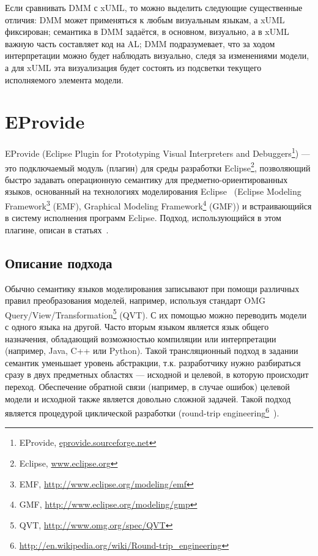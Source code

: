\documentclass[a5paper]{article}
\begin{document}
Если сравнивать DMM с xUML, то можно выделить следующие существенные отличия: DMM может применяться к любым визуальным языкам, а xUML фиксирован; семантика в DMM задаётся, в основном, визуально, а в xUML важную часть составляет код на AL; DMM подразумевает, что за ходом интерпретации можно будет наблюдать визуально, следя за изменениями модели, а для xUML эта визуализация будет состоять из подсветки текущего исполняемого элемента модели. 

\section{EProvide}

EProvide (Eclipse Plugin for Prototyping Visual Interpreters and Debuggers\footnote{EProvide, \url{eprovide.sourceforge.net}}) — это подключаемый модуль (плагин) для среды разработки Eclipse\footnote{Eclipse, \url{www.eclipse.org}}, позволяющий быстро задавать операционную семантику для предметно-ориентированных языков, основанный на технологиях моделирования Eclipse~\cite{koznov7} (Eclipse Modeling Framework\footnote{EMF, \url{http://www.eclipse.org/modeling/emf}} (EMF), Graphical Modeling Framework\footnote{GMF, \url{http://www.eclipse.org/modeling/gmp}} (GMF)) и встраивающийся в систему исполнения программ Eclipse. Подход, использующийся в этом плагине, описан в статьях~\cite{wachsmuth1, wachsmuth2}.

\subsection{Описание подхода}

Обычно семантику языков моделирования записывают при помощи различных правил преобразования моделей, например, используя стандарт OMG Query/View/Transformation\footnote{QVT, \url{http://www.omg.org/spec/QVT}} (QVT). С их помощью можно переводить модели с одного языка на другой. Часто вторым языком является язык общего назначения, обладающий возможностью компиляции или интерпретации (например, Java, C++ или Python). Такой трансляционный подход в задании семантик уменьшает уровень абстракции, т.к. разработчику нужно разбираться сразу в двух предметных областях — исходной и целевой, в которую происходит переход. Обеспечение обратной связи (например, в случае ошибок) целевой модели и исходной также является довольно сложной задачей. Такой подход является процедурой циклической разработки (round-trip engineering\footnote{\url{http://en.wikipedia.org/wiki/Round-trip_engineering}}~\cite{roundtrip}).
\end{document}
